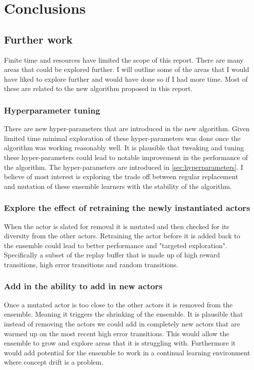 \chapter{Conclusions}\label{C:con}

\section{Further work}

Finite time and resources have limited the scope of this report. There are many areas that could be explored further. I will outline some of the areas that I would have liked to explore further and would have done so if I had more time. Most of these are related to the new algorithm proposed in this report.

\subsection{Hyperparameter tuning}
There are new hyper-parameters that are introduced in the new algorithm. Given limited time minimal exploration of these hyper-parameters was done once the algorithm was working reasonably well. It is plausible that tweaking and tuning these hyper-parameters could lead to notable improvement in the performance of the algorithm. The hyper-parameters are introduced in \ref{sec:hyperparameters}. I believe of most interest is exploring the trade off between regular replacement and mutation of these ensemble learners with the stability of the algorithm.

\subsection{Explore the effect of retraining the newly instantiated actors}
When the actor is slated for removal it is mutated and then checked for its diversity from the other actors. Retraining the actor before it is added back to the ensemble could lead to better performance and "targeted exploration". Specifically a subset of the replay buffer that is made up of high reward transitions, high error transitions and random transitions.

\subsection{Add in the ability to add in new actors}
Once a mutated actor is too close to the other actors it is removed from the ensemble. Meaning it triggers the shrinking of the ensemble. It is plausible that instead of removing the actors we could add in completely new actors that are warmed up on the most recent high error transitions. This would allow the ensemble to grow and explore areas that it is struggling with. Furthermore it would add potential for the ensemble to work in a continual learning environment where concept drift is a problem.

